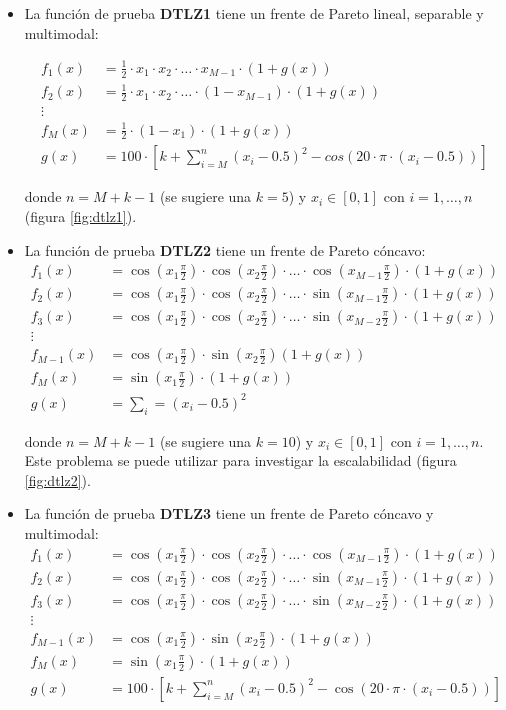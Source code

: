 \begin{itemize}
\item La funci\'on de prueba \textbf{DTLZ1} tiene un frente de Pareto lineal, separable y multimodal:

\begin{align*}
f_1(x)&=\frac{1}{2}\cdot x_1\cdot x_2 \cdot \ldots \cdot x_{M-1} \cdot (1+g(x))\\
f_2(x)&=\frac{1}{2}\cdot x_1\cdot x_2 \cdot \ldots \cdot(1-x_{M-1})\cdot(1+g(x))\\
\vdots&\\
f_M(x)&=\frac{1}{2}\cdot(1-x_1)\cdot(1+g(x))\\
g(x)&=100\cdot[k+\sum_{i=M}^n(x_i-0.5)^2-cos(20\cdot\pi\cdot(x_i-0.5))]
\end{align*}

donde $n=M+k-1$ (se sugiere una $k=5$) y $x_i\in[0,1]$ con $i = 1, \ldots, n$ (figura \ref{fig:dtlz1}).


 \item La funci\'on de prueba \textbf{DTLZ2} tiene un frente de Pareto c\'oncavo:
\begin{align*}
f_1(x)&=\cos(x_1\frac{\pi}{2})\cdot\cos(x_2\frac{\pi}{2})\cdot\ldots\cdot\cos(x_{M-1}\frac{\pi}{2})\cdot(1+g(x))\\
f_2(x)&=\cos(x_1\frac{\pi}{2})\cdot\cos(x_2\frac{\pi}{2})\cdot\ldots\cdot\sin(x_{M-1}\frac{\pi}{2})\cdot(1+g(x))\\
f_3(x)&=\cos(x_1\frac{\pi}{2})\cdot\cos(x_2\frac{\pi}{2})\cdot\ldots\cdot\sin(x_{M-2}\frac{\pi}{2})\cdot(1+g(x))\\
\vdots&\\
f_{M-1}(x)&=\cos(x_1\frac{\pi}{2})\cdot\sin(x_2\frac{\pi}{2})(1+g(x))\\
f_{M}(x)&=\sin(x_1\frac{\pi}{2})\cdot(1+g(x))\\
g(x)&=\sum_i=(x_i-0.5)^2
\end{align*}

donde $n=M+k-1$ (se sugiere una $k=10$) y $x_i\in[0,1]$ con $i= 1, \ldots, n$. Este problema se puede utilizar para investigar la 
escalabilidad (figura \ref{fig:dtlz2}).

\item La funci\'on de prueba \textbf{DTLZ3} tiene un frente de Pareto c\'oncavo y multimodal:
\begin{align*}
f_1(x)&=\cos(x_1\frac{\pi}{2})\cdot\cos(x_2\frac{\pi}{2})\cdot\ldots\cdot \cos(x_{M-1}\frac{\pi}{2})\cdot(1+g(x))\\
f_2(x)&=\cos(x_1\frac{\pi}{2})\cdot\cos(x_2\frac{\pi}{2})\cdot\ldots\cdot \sin(x_{M-1}\frac{\pi}{2})\cdot(1+g(x))\\
f_3(x)&=\cos(x_1\frac{\pi}{2})\cdot\cos(x_2\frac{\pi}{2})\cdot\ldots\cdot \sin(x_{M-2}\frac{\pi}{2})\cdot(1+g(x))\\
\vdots&\\
f_{M-1}(x)&=\cos(x_1\frac{\pi}{2})\cdot\sin(x_2\frac{\pi}{2})\cdot(1+g(x))\\
f_{M}(x)&=\sin(x_1\frac{\pi}{2})\cdot (1+g(x))\\
g(x)&=100\cdot [k+\sum_{i=M}^n(x_i-0.5)^2-\cos(20\cdot\pi\cdot(x_i-0.5))]
\end{align*}


\end{itemize}
